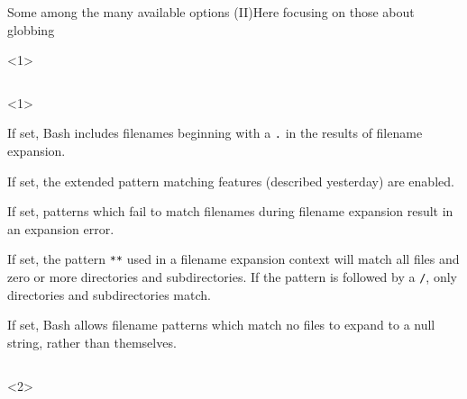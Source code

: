 \begin{frame}[fragile]{Some among the many available options (II)}{Here focusing on those about globbing}
    \begin{onlyenv}<1>
        \vspace{-6mm}
        \begin{columns}
            \begin{column}{\dimexpr\paperwidth-10mm}
                \begin{onlyenv}<1>
                    \begin{description}
                        \setlength{\itemsep}{3mm}
                        \item[\PB{\texttt{dotglob}}]
                            If set, Bash includes filenames beginning with a \texttt{.} in the results of filename expansion.\\[-1mm]
                        \item[\PB{\texttt{extglob}}]
                            If set, the extended pattern matching features (described yesterday) are enabled.
                        \item[\PB{\texttt{failglob}}]
                            If set, patterns which fail to match filenames during filename expansion result in an expansion error.
                        \item[\PB{\texttt{globstar}}]
                            If set, the pattern \texttt{**} used in a filename expansion context will match all files and zero or more directories and subdirectories.
                            If the pattern is followed by a \texttt{/}, only directories and subdirectories match. 
                        \item[\PB{\texttt{nullglob}}]
                            If set, Bash allows filename patterns which match no files to expand to a null string, rather than themselves.
                    \end{description}
                \end{onlyenv}
            \end{column}
        \end{columns}
    \end{onlyenv}
    \begin{onlyenv}<2>
        \begin{lstlisting}[style=myBash, style=smaller]

\end{lstlisting}
\end{onlyenv}
\end{frame}
